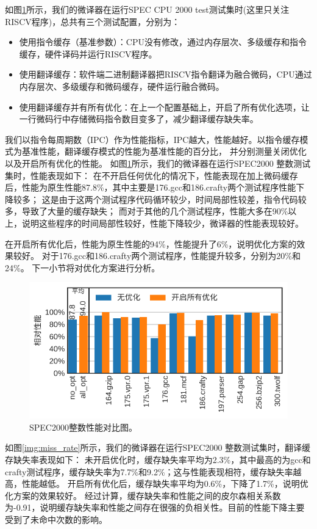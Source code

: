如图\ref{img:ipc}所示，我们的微译器在运行SPEC CPU 2000 test测试集时(这里只关注RISCV程序)，总共有三个测试配置，分别为：
\begin{itemize}
  \item 使用指令缓存（基准参数）：CPU没有修改，通过内存层次、多级缓存和指令缓存，硬件译码并运行RISCV程序。
  \item 使用翻译缓存：软件端二进制翻译器把RISCV指令翻译为融合微码，CPU通过内存层次、多级缓存和微码缓存，硬件运行融合微码。
  \item 使用翻译缓存并有所有优化：在上一个配置基础上，开启了所有优化选项，让一行微码行中存储微码指令数目变多了，减少翻译缓存缺失率。
\end{itemize}

我们以指令每周期数（IPC）作为性能指标，IPC越大，性能越好。以指令缓存模式为基准性能，翻译缓存模式的性能为基准性能的百分比，
并分别测量关闭优化以及开启所有优化的性能。
如图\ref{img:ipc}所示，我们的微译器在运行SPEC2000 整数测试集时，性能表现如下：
在不开启任何优化的情况下，性能表现在加上微码缓存后，性能为原生性能87.8\%，其中主要是176.gcc和186.crafty两个测试程序性能下降较多；
这是由于这两个测试程序代码循环较少，时间局部性较差，指令代码较多，导致了大量的缓存缺失；
而对于其他的几个测试程序，性能大多在90\%以上，说明这些程序的时间局部性较好，性能下降较少，微译器的性能表现较好。

在开启所有优化后，性能为原生性能的94\%，性能提升了6\%，说明优化方案的效果较好。
对于176.gcc和186.crafty两个测试程序，性能提升较多，分别为20\%和24\%。
下一小节将对优化方案进行分析。


\begin{figure}[!htbp]
  \centering
  \includegraphics[width=0.8\linewidth]{./plot/ucache_ipc.pdf}
  \caption{SPEC2000整数性能对比图。}
  \label{img:ipc}
\end{figure}

如图\ref{img:miss_rate}所示，我们的微译器在运行SPEC2000 整数测试集时，翻译缓存缺失率表现如下：
未开启优化时，缓存缺失率平均为2.3\%，其中最高的为gcc和crafty测试程序，缓存缺失率为7.7\%和9.2\%；这与性能表现相符，缓存缺失率越高，性能越低。
开启所有优化后，缓存缺失率平均为0.6\%，下降了1.7\%，说明优化方案的效果较好。
经过计算，缓存缺失率和性能之间的皮尔森相关系数为-0.91，说明缓存缺失率和性能之间存在很强的负相关性。目前的性能下降主要受到了未命中次数的影响。

